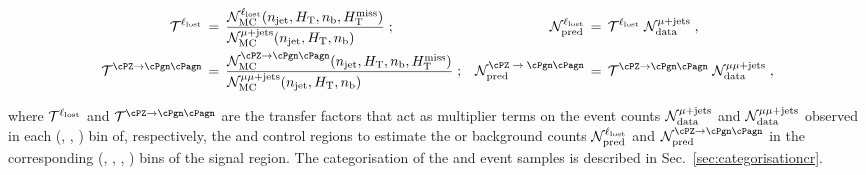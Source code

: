 \begin{align}
  \tf^{\lost} \, & = \,
  \frac{\mathcal{N}^{\lost}_\textrm{MC}(\njet, \scalht, \nb, \mht)}
  {\mathcal{N}^{\mj}_\textrm{MC}(\njet, \scalht, \nb)\hfill} \; ;
  & 
  \mathcal{N}^{\lost}_\textrm{pred} \, & = \,
  \tf^{\lost} \; \mathcal{N}^{\mj}_\textrm{data} \; ,
  \\
  \tf^{\znunu} \, & = \,
  \frac{\mathcal{N}^{\znunu}_\textrm{MC}(\njet, \scalht, \nb, \mht)}
  {\mathcal{N}^{\mmj}_\textrm{MC}(\njet, \scalht, \nb)\hfill} \; ;
  & 
  \mathcal{N}^\textrm{\znunu}_\textrm{pred} \, & = \,
  \tf^{\znunu} \; \mathcal{N}^{\mmj}_\textrm{data} \; ,
\end{align}

where $\mathcal{T}^{\ell_\textrm{lost}}$ and $\tf^{\znunu}$ are the transfer factors that
act as multiplier terms on the event counts
$\mathcal{N}^{\mu + \text{jets}}_\textrm{data}$ and
$\mathcal{N}^{\mu\mu + \text{jets}}_\textrm{data}$ observed in each (\njet, \scalht,
\nb) bin of, respectively, the \mj and \mmj control regions to
estimate the \lost or \znunuj background counts
$\mathcal{N}^{\ell_\textrm{lost}}_\textrm{pred}$ and
$\mathcal{N}^{\znunu}_\textrm{pred}$ in the corresponding (\njet,
\scalht, \nb, \mht) bins of the signal region. The categorisation of
the \mj and \mmj event samples is described in
Sec.~\ref{sec:categorisationcr}.

